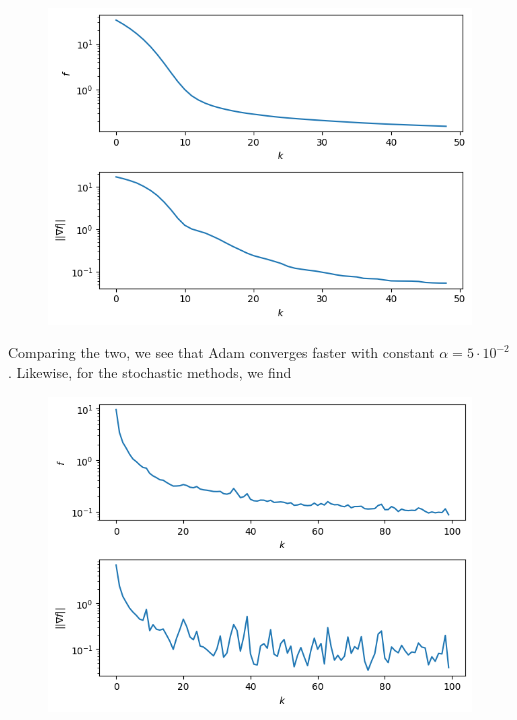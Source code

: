 \documentclass{../kin_math}
\begin{document}
\begin{questions}
\begin{solution}
\begin{figure}
      \includegraphics[scale=0.8]{det_adam.png}
    \end{figure}
    Comparing the two, we see that Adam converges faster with constant $\alpha = 5 \cdot 10^{-2}$. Likewise, for the stochastic methods, we find
    \begin{figure}
      \centering
      \includegraphics[scale=0.8]{stoch_nest.png}
    \end{figure}
    \begin{figure}
      \centering

\end{figure}
\end{solution}
\end{questions}
\end{document}
